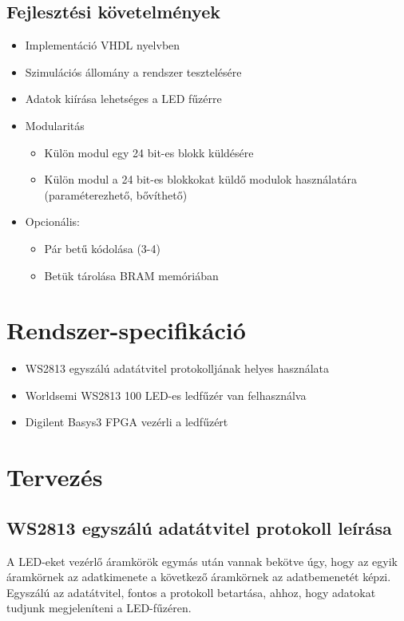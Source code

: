 \documentclass[10pt]{article} %
\begin{document}
\subsection{Fejlesztési követelmények}
\begin{itemize}
\item Implementáció VHDL nyelvben
\item Szimulációs állomány a rendszer tesztelésére
\item Adatok kiírása lehetséges a LED fűzérre
\item Modularitás
\begin{itemize}
	\item Külön modul egy 24 bit-es blokk küldésére
	\item Külön modul a 24 bit-es blokkokat küldő modulok használatára (paraméterezhető, bővíthető)
\end{itemize}
\item Opcionális: 
\begin{itemize}
	\item Pár betű kódolása (3-4)
	\item Betük tárolása BRAM memóriában
\end{itemize}
\end{itemize}

\section{Rendszer-specifikáció}

\begin{itemize}
\item WS2813 egyszálú adatátvitel protokolljának helyes használata
\item Worldsemi WS2813 100 LED-es ledfűzér van felhasználva
\item Digilent Basys3 FPGA vezérli a ledfűzért 
\end{itemize}

\section{Tervezés}


\subsection{WS2813 egyszálú adatátvitel protokoll leírása}

\indent A LED-eket vezérlő áramkörök egymás után vannak bekötve úgy, hogy az egyik áramkörnek az adatkimenete a következő áramkörnek az adatbemenetét képzi. Egyszálú az adatátvitel, fontos a protokoll betartása, ahhoz, hogy adatokat tudjunk megjeleníteni a LED-fűzéren.
\end{document}

